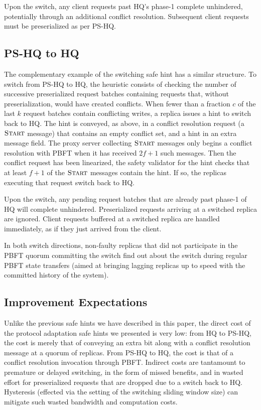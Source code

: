 \documentclass[twocolumn,10pt]{article}
\newcommand{\msg}[1]{\ensuremath{\textsc{#1}}}
\begin{document}
Upon the switch, any client requests past HQ's
phase-1 complete unhindered, potentially through an additional conflict
resolution.  Subsequent client requests must be preserialized as per
PS-HQ.



\subsection{PS-HQ to HQ}

The complementary example of the switching safe hint has a similar
structure.  To switch from PS-HQ to HQ, the heuristic consists of
checking the number of successive preserialized request batches 
containing requests that, without preserialization, would have created
conflicts.  When fewer than a fraction $c$ of the last $k$ request
batches contain conflicting writes, a replica issues a hint to switch
back to HQ.  The hint is conveyed, as above, in a conflict resolution
request (a \msg{Start} message) that contains an empty conflict set, and
a hint in an extra message field.  The proxy server collecting
\msg{Start} messages only begins a conflict resolution with PBFT when it
has received $2f+1$ such messages.  Then the conflict request has been
linearized, the safety validator for the hint checks that at least $f+1$
of the \msg{Start} messages contain the hint.  If so, the replicas
executing that request switch back to HQ.

Upon the switch, any pending request batches that are already
past phase-1 of HQ will complete unhindered. Preserialized
requests arriving at a switched replica are ignored.
Client requests buffered at a switched replica are handled immediately,
as if they just arrived from the client. 

In both switch directions, non-faulty replicas that did not participate in the PBFT quorum
committing the switch find out about the switch during regular PBFT
state transfers (aimed at bringing lagging replicas up to speed with the
committed history of the system).



\subsection{Improvement Expectations}

Unlike the previous safe hints we have described in this paper, the
direct cost of the protocol adaptation safe hints we presented is very
low: from HQ to PS-HQ, the cost is merely that of conveying an extra bit
along with a conflict resolution message at a quorum of replicas.  From
PS-HQ to HQ, the cost is that of a conflict resolution invocation
through PBFT.  Indirect costs are tantamount to premature or delayed
switching, in the form of missed benefits, and in wasted effort for
preserialized requests that are dropped due to a switch back to HQ.
Hysteresis (effected via the setting of the switching sliding window
size) can mitigate such wasted bandwidth and computation costs.
\end{document}
